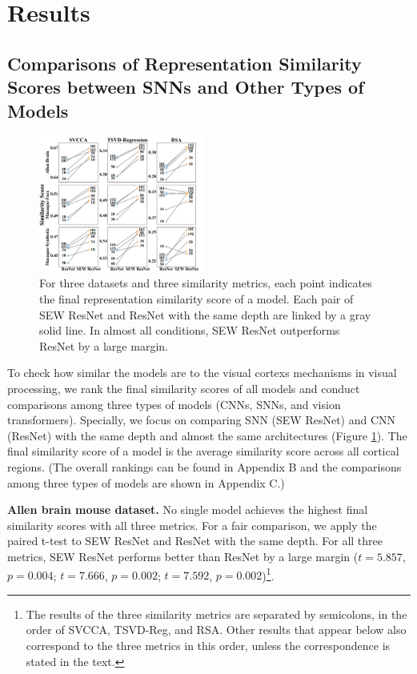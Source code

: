 \documentclass[letterpaper]{article} %
\begin{document}
\section{Results}
\label{results}

\subsection{Comparisons of Representation Similarity Scores between SNNs and Other Types of Models}
\label{results.overall}

\begin{figure}[t]
	\centering
	\includegraphics[width=0.48\textwidth]{figs/resnet_compare.pdf}
	\caption{For three datasets and three similarity metrics, each point indicates the final representation similarity score of a model. Each pair of SEW ResNet and ResNet with the same depth are linked by a gray solid line. In almost all conditions, SEW ResNet outperforms ResNet by a large margin.}
	\label{Fig.resnet_compare}
\end{figure}

To check how similar the models are to the visual cortexs mechanisms in visual processing, we rank the final similarity scores of all models and conduct comparisons among three types of models (CNNs, SNNs, and vision transformers). Specially, we focus on comparing SNN (SEW ResNet) and CNN (ResNet) with the same depth and almost the same architectures (Figure \ref{Fig.resnet_compare}). The final similarity score of a model is the average similarity score across all cortical regions. (The overall rankings can be found in Appendix B and the comparisons among three types of models are shown in Appendix C.)

\textbf{Allen brain mouse dataset.} No single model achieves the highest final similarity scores with all three metrics. For a fair comparison, we apply the paired t-test to SEW ResNet and ResNet with the same depth. For all three metrics, SEW ResNet performs better than ResNet by a large margin ($t=5.857$, $p=0.004$; $t=7.666$, $p=0.002$; $t=7.592$, $p=0.002$)\footnote{The results of the three similarity metrics are separated by semicolons, in the order of SVCCA, TSVD-Reg, and RSA. Other results that appear below also correspond to the three metrics in this order, unless the correspondence is stated in the text.}. 
\end{document}
